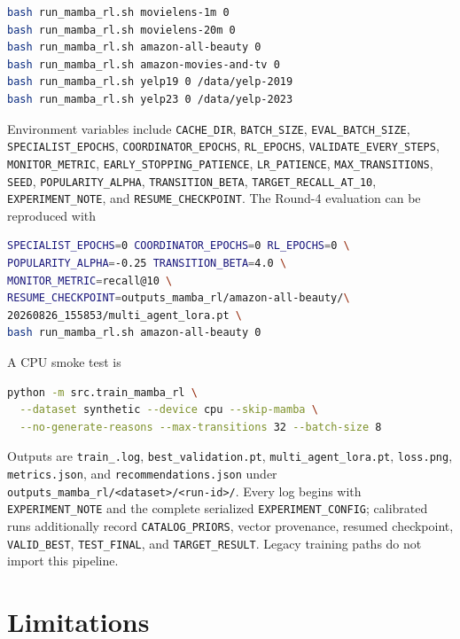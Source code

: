 \documentclass[11pt,a4paper]{article}
\begin{document}
\begin{lstlisting}[language=bash]
bash run_mamba_rl.sh movielens-1m 0
bash run_mamba_rl.sh movielens-20m 0
bash run_mamba_rl.sh amazon-all-beauty 0
bash run_mamba_rl.sh amazon-movies-and-tv 0
bash run_mamba_rl.sh yelp19 0 /data/yelp-2019
bash run_mamba_rl.sh yelp23 0 /data/yelp-2023
\end{lstlisting}

Environment variables include \texttt{CACHE\_DIR},
\texttt{BATCH\_SIZE}, \texttt{EVAL\_BATCH\_SIZE},
\texttt{SPECIALIST\_EPOCHS}, \texttt{COORDINATOR\_EPOCHS},
\texttt{RL\_EPOCHS}, \texttt{VALIDATE\_EVERY\_STEPS},
\texttt{MONITOR\_METRIC}, \texttt{EARLY\_STOPPING\_PATIENCE},
\texttt{LR\_PATIENCE}, \texttt{MAX\_TRANSITIONS}, \texttt{SEED},
\texttt{POPULARITY\_ALPHA}, \texttt{TRANSITION\_BETA},
\texttt{TARGET\_RECALL\_AT\_10}, \texttt{EXPERIMENT\_NOTE}, and
\texttt{RESUME\_CHECKPOINT}. The Round-4 evaluation can be reproduced with
\begin{lstlisting}[language=bash]
SPECIALIST_EPOCHS=0 COORDINATOR_EPOCHS=0 RL_EPOCHS=0 \
POPULARITY_ALPHA=-0.25 TRANSITION_BETA=4.0 \
MONITOR_METRIC=recall@10 \
RESUME_CHECKPOINT=outputs_mamba_rl/amazon-all-beauty/\
20260826_155853/multi_agent_lora.pt \
bash run_mamba_rl.sh amazon-all-beauty 0
\end{lstlisting}
A CPU smoke test is
\begin{lstlisting}[language=bash]
python -m src.train_mamba_rl \
  --dataset synthetic --device cpu --skip-mamba \
  --no-generate-reasons --max-transitions 32 --batch-size 8
\end{lstlisting}

Outputs are \texttt{train\_<run-id>.log},
\texttt{best\_validation.pt}, \texttt{multi\_agent\_lora.pt},
\texttt{loss.png}, \texttt{metrics.json}, and
\texttt{recommendations.json} under
\texttt{outputs\_mamba\_rl/<dataset>/<run-id>/}. Every log begins with
\texttt{EXPERIMENT\_NOTE} and the complete serialized
\texttt{EXPERIMENT\_CONFIG}; calibrated runs additionally record
\texttt{CATALOG\_PRIORS}, vector provenance, resumed checkpoint,
\texttt{VALID\_BEST}, \texttt{TEST\_FINAL}, and
\texttt{TARGET\_RESULT}. Legacy training paths do not import this pipeline.

\section{Limitations}
\end{document}

